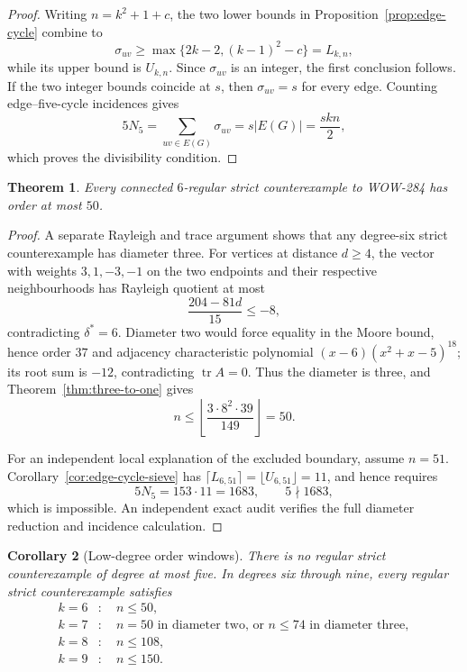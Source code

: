 \documentclass[a4paper,10pt,reqno]{amsart}
\theoremstyle{plain}
\newtheorem{theorem}{Theorem}[section]
\newtheorem{corollary}[theorem]{Corollary}
\theoremstyle{definition}
\theoremstyle{remark}
\newcommand{\tr}{\operatorname{tr}}
\begin{document}
\begin{proof}
Writing \(n=k^2+1+c\), the two lower bounds in
Proposition~\ref{prop:edge-cycle} combine to
\[
 \sigma_{uv}\ge
 \max\{2k-2,(k-1)^2-c\}=L_{k,n},
\]
while its upper bound is \(U_{k,n}\).  Since \(\sigma_{uv}\) is an integer,
the first conclusion follows.  If the two integer bounds coincide at \(s\),
then \(\sigma_{uv}=s\) for every edge.  Counting edge--five-cycle incidences
gives
\[
 5N_5=\sum_{uv\in E(G)}\sigma_{uv}
 =s|E(G)|=\frac{skn}{2},
\]
which proves the divisibility condition.
\end{proof}

\begin{theorem}\label{thm:degree-six-fifty}
Every connected \(6\)-regular strict counterexample to WOW-284 has order at
most \(50\).
\end{theorem}

\begin{proof}
A separate Rayleigh and trace argument shows that any degree-six strict
counterexample has diameter three.  For vertices at distance \(d\ge4\), the
vector with weights \(3,1,-3,-1\) on the two endpoints and their respective
neighbourhoods has Rayleigh quotient at most
\[
 \frac{204-81d}{15}\le-8,
\]
contradicting \(\delta^*=6\).  Diameter two would force equality in the
Moore bound, hence order \(37\) and adjacency characteristic polynomial
\((x-6)(x^2+x-5)^{18}\); its root sum is \(-12\), contradicting
\(\tr A=0\).  Thus the diameter is three, and
 Theorem~\ref{thm:three-to-one} gives
\[
 n\le\left\lfloor\frac{3\cdot8^2\cdot39}{149}\right\rfloor=50.
\]

For an independent local explanation of the excluded boundary, assume
\(n=51\).  Corollary~\ref{cor:edge-cycle-sieve} has
\(\lceil L_{6,51}\rceil=\lfloor U_{6,51}\rfloor=11\), and hence requires
\[
 5N_5=153\cdot11=1683,
 \qquad 5\nmid 1683,
\]
which is impossible.  An independent exact audit verifies the full diameter
reduction and incidence calculation.
\end{proof}

\begin{corollary}[Low-degree order windows]\label{cor:low-degree-windows}
There is no regular strict counterexample of degree at most five.  In degrees
six through nine, every regular strict counterexample satisfies
\begin{align*}
k=6&:\quad n\le50,\\
k=7&:\quad n=50\text{ in diameter two, or }n\le74\text{ in diameter three},\\
k=8&:\quad n\le108,\\
k=9&:\quad n\le150.
\end{align*}
\end{corollary}
\end{document}
